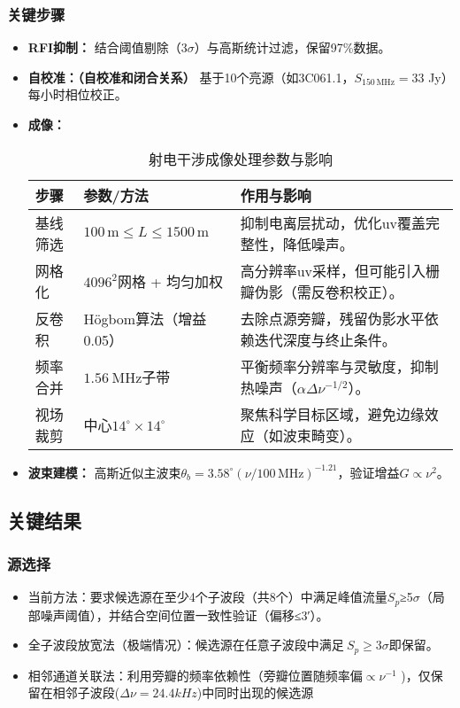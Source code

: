 \documentclass{article}
\begin{document}
\subsubsection{关键步骤}
\begin{itemize}
    \item \textbf{RFI抑制：} 结合阈值剔除（3$\sigma$）与高斯统计过滤，保留97\%数据。
    \item \textbf{自校准：（自校准和闭合关系）} 基于10个亮源（如3C061.1，$S_{150\,\text{MHz}} = 33$ Jy）每小时相位校正。
    \item \textbf{成像：}
    \begin{table}[htbp]
\centering
\caption{射电干涉成像处理参数与影响}
\label{tab:radio_imaging}
\begin{tabular}{@{}lll@{}}
\toprule
\textbf{步骤} & \textbf{参数/方法} & \textbf{作用与影响} \\
\midrule
基线筛选 & 
$100\,\text{m} \leq L \leq 1500\,\text{m}$ & 
抑制电离层扰动，优化uv覆盖完整性，降低噪声。 \\
\addlinespace

网格化 & 
$4096^2$网格 + 均匀加权 & 
高分辨率uv采样，但可能引入栅瓣伪影（需反卷积校正）。 \\
\addlinespace

反卷积 & 
Högbom算法（增益0.05） & 
去除点源旁瓣，残留伪影水平依赖迭代深度与终止条件。 \\
\addlinespace

频率合并 & 
$\SI{1.56}{\mega\hertz}$子带 & 
平衡频率分辨率与灵敏度，抑制热噪声（$\alpha \Delta \nu^{-1/2}$）。 \\
\addlinespace

视场裁剪 & 
中心$14^\circ \times 14^\circ$ & 
聚焦科学目标区域，避免边缘效应（如波束畸变）。 \\
\bottomrule
\end{tabular}
\end{table}
    
    \item \textbf{波束建模：} 高斯近似主波束$\theta_b = 3.58^\circ (\nu/100\,\text{MHz})^{-1.21}$，验证增益$G \propto \nu^2$。
\end{itemize}

\subsection{关键结果}
\subsubsection{源选择}
\begin{itemize}
    \item 当前方法：要求候选源在至少4个子波段（共8个）中满足峰值流量$S_p$≥5$\sigma$（局部噪声阈值），并结合空间位置一致性验证（偏移≤3′）。
    \item 全子波段放宽法（极端情况）：候选源在任意子波段中满足$\ S_p≥3σ$即保留。
    \item 相邻通道关联法：利用旁瓣的频率依赖性（旁瓣位置随频率偏$\propto \nu^{-1}$ )，仅保留在相邻子波段($\Delta \nu = 24.4 kHz$)中同时出现的候选源
\end{itemize}
\end{document}
